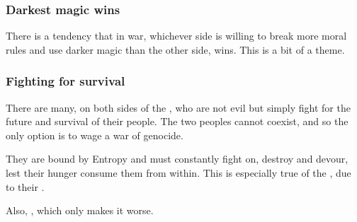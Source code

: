 \subsubsection{Darkest magic wins}
There is a tendency that in war, whichever side is willing to break more moral rules and use darker magic than the other side, wins. 
This is a bit of a theme. 






\subsubsection{Fighting for survival}
There are many, on both sides of the , who are not evil but simply fight for the future and survival of their people. The two peoples cannot coexist, and so the only option is to wage a war of genocide. 

They are bound by Entropy and must constantly fight on, destroy and devour, lest their hunger consume them from within. 
This is especially true of the \resphain, due to their . 

Also, , which only makes it worse.



